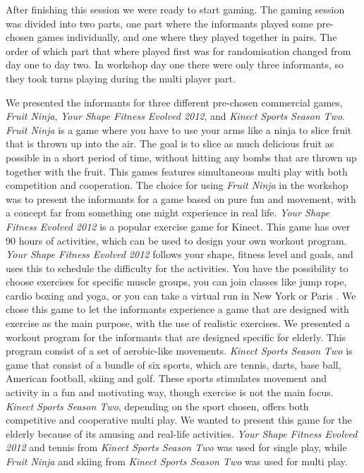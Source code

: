 After finishing this session we were ready to start gaming. The gaming session was divided into two parts, one part where the informants played some pre-chosen games individually, and one where they played together in pairs. The order of which part that where played first was for randomisation changed from day one to day two. In workshop day one there were only three informants, so they took turns playing during the multi player part. 

We presented the informants for three different pre-chosen commercial games, \emph{Fruit Ninja}, \emph{Your Shape Fitness Evolved 2012}, and \emph{Kinect Sports Season Two}. \emph{Fruit Ninja} is a game where you have to use your arms like a ninja to slice fruit that is thrown up into the air. The goal is to slice as much delicious fruit as possible in a short period of time, without hitting any bombs that are thrown up together with the fruit. This games features simultaneous multi play with both competition and cooperation. The choice for using \emph{Fruit Ninja} in the workshop was to present the informants for a game based on pure fun and movement, with a concept far from something one might experience in real life. \emph{Your Shape Fitness Evolved 2012} is a popular exercise game for Kinect. This game has over 90 hours of activities, which can be used to design your own workout program. \emph{Your Shape Fitness Evolved 2012} follows your shape, fitness level and goals, and uses this to schedule the difficulty for the activities. You have the possibility to choose exercises for specific muscle groups, you can join classes like jump rope, cardio boxing and yoga, or you can take a virtual run in New York or Paris \cite{yourshape}. We chose this game to let the informants experience a game that are designed with exercise as the main purpose, with the use of realistic exercises. We presented a workout program for the informants that are designed specific for elderly. This program consist of a set of aerobic-like movements. \emph{Kinect Sports Season Two} is game that consist of a bundle of six sports, which are tennis, darts, base ball, American football, skiing and golf. These sports stimulates movement and activity in a fun and motivating way, though exercise is not the main focus. \emph{Kinect Sports Season Two}, depending on the sport chosen, offers both competitive and cooperative multi play. We wanted to present this game for the elderly because of its amusing and real-life activities. \emph{Your Shape Fitness Evolved 2012} and tennis from \emph{Kinect Sports Season Two} was used for single play, while \emph{Fruit Ninja} and skiing from \emph{Kinect Sports Season Two} was used for multi play. 

